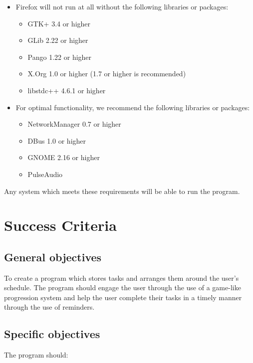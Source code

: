 \documentclass{article}
\begin{document}
\begin{itemize}
\item Firefox will not run at all without the following libraries or packages:

  \begin{itemize}
  \item GTK+ 3.4 or higher
  \item GLib 2.22 or higher
  \item Pango 1.22 or higher
  \item X.Org 1.0 or higher (1.7 or higher is recommended)
  \item libstdc++ 4.6.1 or higher
  \end{itemize}
\item For optimal functionality, we recommend the following libraries or
  packages:

  \begin{itemize}
  \item NetworkManager 0.7 or higher \index{\item}\index{\item}\item DBus 1.0 or
    higher
  \item GNOME 2.16 or higher
  \item PulseAudio
  \end{itemize}
\end{itemize}

Any system which meets these requirements will be able to run the program.

\section{Success Criteria}

\subsection{General objectives}
To create a program which stores tasks and arranges them around the user's
schedule. The program should engage the user through the use of a game-like
progression system and help the user complete their tasks in a timely manner
through the use of reminders.

\subsection{Specific objectives}
The program should:
\end{document}
